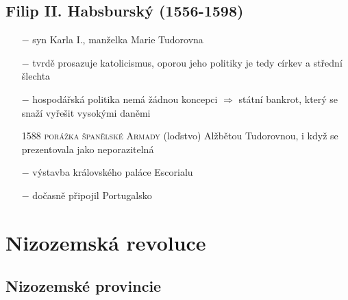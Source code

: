 \documentclass{article}
\begin{document}
\subsection*{Filip II. Habsburský (1556-1598)}
\begin{itemize}
    \vspace{-0.5em}
    \setlength\itemsep{0.15em}
    \item[$-$] syn Karla I., manželka Marie Tudorovna
    \item[$-$] tvrdě prosazuje katolicismus, oporou jeho politiky je tedy církev a střední šlechta
    \item[$-$] hospodářská politika nemá žádnou koncepci $\Rightarrow$ státní bankrot, který se snaží vyřešit vysokými daněmi
    \item[1588] \textsc{porážka španělské Armady} (loďstvo) Alžbětou Tudorovnou, i když se prezentovala jako neporazitelná
    \item[$-$] výstavba královského paláce Escorialu
    \item[$-$] dočasně připojil Portugalsko
\end{itemize}


\section*{Nizozemská revoluce}
\subsection*{Nizozemské provincie}
\end{document}
